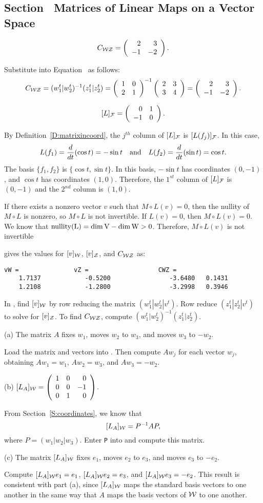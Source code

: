 \subsection*{Section~\protect{\ref{MALT}} Matrices of Linear Maps on a
Vector Space}

\ans
\[ C_{\cal WZ} = \left(\begin{array}{rr} 2 & 3\\ -1 &-2\end{array}\right). \]

\soln Substitute into Equation~ as follows:
\[ C_{\cal WZ} = (w_1^t|w_2^t)^{-1}(z_1^t|z_2^t) =
\left(\begin{array}{rr} 1 & 0\\ 2 &1\end{array}\right)^{-1}\left(\begin{array}{rr} 2 & 3\\ 3 &4\end{array}\right) =
\left(\begin{array}{rr} 2 & 3\\ -1 &-2\end{array}\right). \]

\ans \[ [L]_{\cal F} = \left(\begin{array}{rr} 0 & 1\\ -1 &0\end{array}\right). \]

\soln By Definition~\ref{D:matrixincoord}, the $j^{th}$
column of $[L]_{\cal F}$ is $[L(f_j)]_{\cal F}$.  In this case,
\[
L(f_1) = \frac{d}{dt}(\cos t) = -\sin t \quad\mbox{and}\quad
L(f_2) = \frac{d}{dt}(\sin t) = \cos t.
\]
The basis $\{f_1,f_2\}$ is $\{\cos t,\sin t\}$.  In this basis,
$-\sin t$ has coordinates $(0,-1)$, and $\cos t$ has coordinates
$(1,0)$.  Therefore, the $1^{st}$ column of $[L]_{\cal F}$ is
$(0,-1)$ and the $2^{nd}$ column is $(1,0)$.

If there exists a nonzero vector $v$ such that $M\circ L(v) = 0$,
then the nullity of $M \circ L$ is nonzero, so $M \circ L$ is not
invertible.  If $L(v) = 0$, then $M \circ L(v) = 0$.  We know that
$\rm{nullity}(L) = \dim V - \dim W > 0$.  Therefore, $M\circ L(v)$
is not invertible

\ans \Matlab gives the values for $[v]_{\cal W}$, $[v]_{\cal Z}$, and
$C_{\cal WZ}$ as:
\begin{verbatim}
vW =               vZ =                   CWZ =
    1.7137            -0.5200                -3.6480   0.1431
    1.2108            -1.2800                -3.2998   0.3946
\end{verbatim}

\soln In \Matlabp, find $[v]_{\cal W}$ by row reducing
the matrix $(w_1^t|w_2^t | v^t)$.  Row reduce 
$(z_1^t|z_2^t | v^t)$ to solve for $[v]_{\cal Z}$.  To find
$C_{\cal WZ}$, compute $(w_1^t|w_2^t)^{-1}(z_1^t|z_2^t)$.

(a) \ans The matrix $A$ fixes $w_1$, moves $w_2$ to $w_3$, and moves
$w_3$ to $-w_2$.

\soln Load the matrix and vectors into \Matlabp.  Then compute $Aw_j$ for
each vector $w_j$, obtaining $Aw_1 = w_1$, $Aw_2 = w_3$, and $Aw_3 = -w_2$.

(b) \ans $[L_A]_{\cal W} = \left(\begin{array}{rrr} 1 & 0 & 0 \\ 0 & 0 & -1 \\ 0 & 1 & 0\end{array}\right)$.

\soln From Section~\ref{S:coordinates}, we know that
\[
[L_A]_{\cal W} = P^{-1}AP,
\]
where $P = (w_1|w_2|w_3)$.  Enter {\tt P} into \Matlab and compute this
matrix.

(c) \ans The matrix $[L_A]_{\cal W}$ fixes $e_1$, moves $e_2$ to
$e_3$, and moves $e_3$ to $-e_2$.

\soln Compute $[L_A]_{\cal W}e_1 = e_1$, $[L_A]_{\cal W}e_2 = e_3$, and
$[L_A]_{\cal W}e_3 = -e_2$.  This result is consistent with part (a),
since $[L_A]_{\cal W}$ maps the standard basis vectors to one another
in the same way that $A$ maps the basis vectors of ${\cal W}$ to one
another.
